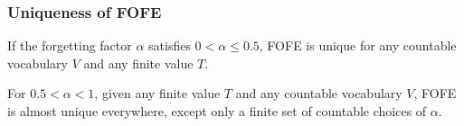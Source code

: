 \documentclass{beamer}
\begin{document}
\begin{frame}
\frametitle{Uniqueness of FOFE}
\begin{theorem}
	If the forgetting factor $\alpha$ satisfies $0 < \alpha \leq 0.5$, 
	FOFE is unique for any countable vocabulary $V$ and any finite value $T$.
\end{theorem}
\begin{theorem}
	For $0.5 < \alpha < 1 $, given any finite value $T$ and any countable vocabulary $V$,
	FOFE is almost unique everywhere, except only a finite set of countable choices of $\alpha$.
\end{theorem}
\end{frame}
\end{document}
